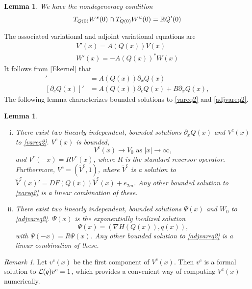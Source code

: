 \documentclass[11pt,reqno]{amsart}
\theoremstyle{plain}
\newtheorem{lemma}[theorem]{Lemma}
\theoremstyle{definition}
\theoremstyle{remark}
\newtheorem{remark}[theorem]{Remark}
\begin{document}
\begin{lemma}\label{nondegenlemma}
We have the nondegeneracy condition
\begin{equation}\label{nondegen2}
T_{Q(0)}W^s(0) \cap T_{Q(0)}W^u(0) = \mathbb{R} Q'(0)
\end{equation}
\end{lemma}

The associated variational and adjoint variational equations are
\begin{align}
V'(x) = A(Q(x)) V(x) \label{vareq2} \\
W'(x) = -A(Q(x))^* W(x) \label{adjvareq2}
\end{align}
It follows from \cref{Ekernel} that 
\begin{align}
[\partial_x Q(x)]' &= A(Q(x))\partial_x Q(x) \label{Qprimevarsol} \\
[\partial_c Q(x)]' &= A(Q(x))\partial_c Q(x) + B \partial_x Q(x), \label{Qcvarsol}
\end{align}
The following lemma characterizes bounded solutions to \eqref{vareq2} and \eqref{adjvareq2}.

\begin{lemma}\label{varadjsolutions}\leavevmode
\begin{enumerate}[(i)]
	\item There exist two linearly independent, bounded solutions $\partial_x Q(x)$ and $V^c(x)$ to \eqref{vareq2}. $V^c(x)$ is bounded,
	\begin{equation}
	V^c(x) \rightarrow V_0 \text{ as }|x| \rightarrow \infty,
	\end{equation}
	and	$V^c(-x) = R V^c(x)$, where $R$ is the standard reversor operator. Furthermore, $V^c = (\tilde{V}^c, 1)$, where $\tilde{V}^c$ is a solution to $\tilde{V}^c(x)' = DF(Q(x)) \tilde{V}^c(x) + e_{2m}$. Any other bounded solution to \eqref{vareq2} is a linear combination of these.

	\item There exist two linearly independent, bounded solutions $\Psi(x)$ and $W_0$ to \eqref{adjvareq2}. $\Psi(x)$ is the exponentially localized solution
	\begin{equation}\label{psicomponents}
	\Psi(x) = (\nabla H(Q(x)), q(x)), 
	\end{equation}
	with $\Psi(-x) = R \Psi(x)$. Any other bounded solution to \eqref{adjvareq2} is a linear combination of these.
\end{enumerate}
\end{lemma}

\begin{remark}\label{remark:computeVc}
Let $v^c(x)$ be the first component of $V^c(x)$. Then $v^c$ is a formal solution to $\mathcal{L}(q) v^c = 1$, which provides a convenient way of computing $V^c(x)$ numerically.
\end{remark}
\end{document}
